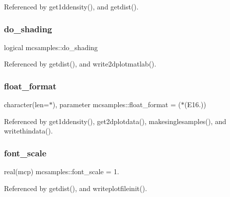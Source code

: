 Referenced by get1ddensity(), and getdist().

\mbox{\label{namespacemcsamples_aea44d2c9cd7dfbed7881a38450903a64}} 
\subsubsection{\texorpdfstring{do\+\_\+shading}{do\_shading}}
{\footnotesize\ttfamily logical mcsamples\+::do\+\_\+shading}



Referenced by getdist(), and write2dplotmatlab().

\mbox{\label{namespacemcsamples_a1d5c81cfc6a6d2a9f25c250cf8359142}} 
\subsubsection{\texorpdfstring{float\+\_\+format}{float\_format}}
{\footnotesize\ttfamily character(len=$\ast$), parameter mcsamples\+::float\+\_\+format = \textquotesingle{}($\ast$(E16.))\textquotesingle{}}



Referenced by get1ddensity(), get2dplotdata(), makesinglesamples(), and writethindata().

\mbox{\label{namespacemcsamples_ae4e5ef0996e111c2f91121884b99ccdc}} 
\subsubsection{\texorpdfstring{font\+\_\+scale}{font\_scale}}
{\footnotesize\ttfamily real(mcp) mcsamples\+::font\+\_\+scale = 1.}



Referenced by getdist(), and writeplotfileinit().

\mbox{\label{namespacemcsamples_a5bf85772fb62752a789a1d253bd6cd5a}} 
